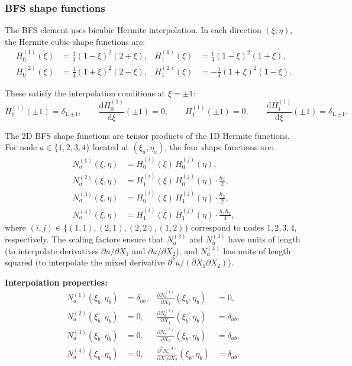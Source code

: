 \documentclass[11pt]{article}
\begin{document}
\subsubsection{BFS shape functions}

The BFS element uses bicubic Hermite interpolation. In each direction
$(\xi,\eta)$, the Hermite cubic shape functions are:
\begin{align}
H_{0}^{(1)}(\xi) &= \tfrac14(1-\xi)^{2}(2+\xi),
&
H_{1}^{(1)}(\xi) &= \tfrac14(1-\xi)^{2}(1+\xi),
\label{s6:H1}\\
H_{0}^{(2)}(\xi) &= \tfrac14(1+\xi)^{2}(2-\xi),
&
H_{1}^{(2)}(\xi) &= -\tfrac14(1+\xi)^{2}(1-\xi).
\label{s6:H2}
\end{align}

These satisfy the interpolation conditions at $\xi=\pm 1$:
\begin{equation}
H_{0}^{(1)}(\pm 1)=\delta_{1,\pm 1},
\qquad
\frac{\mathrm{d}H_{0}^{(1)}}{\mathrm{d}\xi}(\pm 1)=0,
\qquad
H_{1}^{(1)}(\pm 1)=0,
\qquad
\frac{\mathrm{d}H_{1}^{(1)}}{\mathrm{d}\xi}(\pm 1)=\delta_{1,\pm 1}.
\end{equation}

The 2D BFS shape functions are tensor products of the 1D Hermite
functions. For node $a\in\{1,2,3,4\}$ located at $(\xi_{a},\eta_{a})$,
the four shape functions are:
\begin{align}
N_{a}^{(1)}(\xi,\eta) &= H_{0}^{(i)}(\xi)\,H_{0}^{(j)}(\eta),
\label{s6:N1}\\
N_{a}^{(2)}(\xi,\eta) &= H_{1}^{(i)}(\xi)\,H_{0}^{(j)}(\eta)\cdot\frac{h_{1}}{2},
\label{s6:N2}\\
N_{a}^{(3)}(\xi,\eta) &= H_{0}^{(i)}(\xi)\,H_{1}^{(j)}(\eta)\cdot\frac{h_{2}}{2},
\label{s6:N3}\\
N_{a}^{(4)}(\xi,\eta) &= H_{1}^{(i)}(\xi)\,H_{1}^{(j)}(\eta)\cdot\frac{h_{1}h_{2}}{4},
\label{s6:N4}
\end{align}
where $(i,j)\in\{(1,1),(2,1),(2,2),(1,2)\}$ correspond to nodes
$1,2,3,4$, respectively. The scaling factors ensure that $N_{a}^{(2)}$
and $N_{a}^{(3)}$ have units of length (to interpolate derivatives
$\partial u/\partial X_{1}$ and $\partial u/\partial X_{2}$), and
$N_{a}^{(4)}$ has units of length squared (to interpolate the mixed
derivative $\partial^{2}u/(\partial X_{1}\partial X_{2})$).

\textbf{Interpolation properties:}
\begin{align}
N_{a}^{(1)}(\xi_{b},\eta_{b}) &= \delta_{ab},
&
\frac{\partial N_{a}^{(1)}}{\partial X_{1}}(\xi_{b},\eta_{b}) &= 0,
\label{s6:interp1}\\
N_{a}^{(2)}(\xi_{b},\eta_{b}) &= 0,
&
\frac{\partial N_{a}^{(2)}}{\partial X_{1}}(\xi_{b},\eta_{b}) &= \delta_{ab},
\label{s6:interp2}\\
N_{a}^{(3)}(\xi_{b},\eta_{b}) &= 0,
&
\frac{\partial N_{a}^{(3)}}{\partial X_{2}}(\xi_{b},\eta_{b}) &= \delta_{ab},
\label{s6:interp3}\\
N_{a}^{(4)}(\xi_{b},\eta_{b}) &= 0,
&
\frac{\partial^{2}N_{a}^{(4)}}{\partial X_{1}\partial X_{2}}(\xi_{b},\eta_{b}) &= \delta_{ab}.
\label{s6:interp4}
\end{align}
\end{document}
